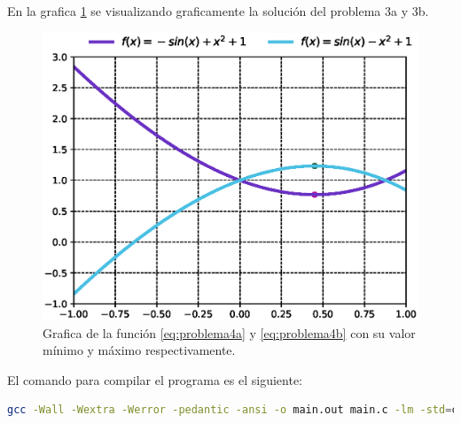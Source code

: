 En la grafica \ref{fig:problema3} se visualizando graficamente la solución del problema 3a y 3b.
\begin{figure}[H]
    \centering
    \includegraphics[width=14cm]{Graphics/problem2.eps}
    \caption{Grafica de la función \ref{eq:problema4a} y \ref{eq:problema4b} con su valor mínimo y máximo respectivamente.}
    \label{fig:problema3}
\end{figure}

El comando para compilar el programa es el siguiente:

\begin{lstlisting}[language=bash]
    gcc -Wall -Wextra -Werror -pedantic -ansi -o main.out main.c -lm -std=c11
\end{lstlisting}